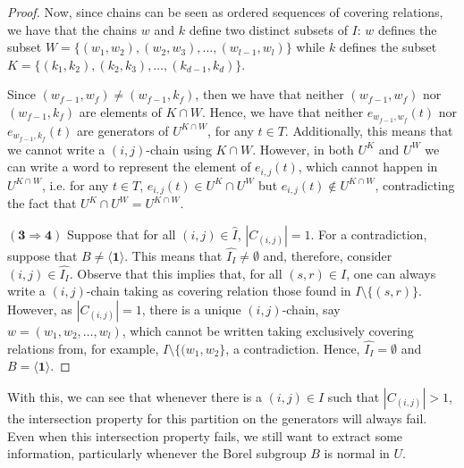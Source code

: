 \documentclass[11pt,letterpaper]{amsart}
\begin{document}
\begin{proof}
    Now, since chains can be seen as ordered sequences of covering relations, we have that the chains $w$ and $k$ define two distinct subsets of $I$: $w$ defines the subset $W=\{(w_1,w_2),(w_2,w_3),\ldots,(w_{l-1},w_l)\}$ while $k$ defines the subset 
    $K=\{(k_1,k_2),(k_2,k_3),\ldots,(k_{d-1},k_d)\}$.

    Since $(w_{f-1},w_f)\neq (w_{f-1},k_f)$, then we have that neither $(w_{f-1},w_f)$ nor $(w_{f-1},k_f)$ are  elements of $K\cap W$. 
    Hence, we have that neither $e_{w_{f-1},w_f}(t)$ nor $e_{w_{f-1},k_f}(t)$ are generators of $U^{K\cap W}$, for any $t\in T$. Additionally, this means that we cannot write a $(i,j)$-chain using $K\cap W$.
    However, in both $U^K$ and $U^W$ we can write a word to represent the element of $e_{i,j}(t)$, which cannot happen in $U^{K\cap W}$, i.e. for any $t\in T$, $e_{i,j}(t)\in U^K\cap U^W$ but $e_{i,j}(t)\notin U^{K\cap W}$, contradicting the fact that $U^K\cap U^W=U^{K\cap W}$.

    
    $\mathbf{(3\Rightarrow 4)}$ Suppose that for all $(i,j)\in \widehat{I}$, $|C_{(i,j)}| = 1$. For a contradiction, suppose that $B\neq \langle \mathbf{1}\rangle$. This means that $\widehat{I_I}\neq \emptyset$ and, therefore, consider $(i,j)\in \widehat{I_I}$. Observe that this implies that, for all $(s,r)\in I$, one can always write a $(i,j)$-chain taking as covering relation those found in $I\setminus\{(s,r)\}$. However, as $|C_{(i,j)}|=1$, there is a unique $(i,j)$-chain, say $w = (w_1,w_2,\ldots,w_l)$, which cannot be written taking exclusively covering relations from, for example, $I\setminus\{(w_1,w_{2}\}$, a contradiction. Hence, $\widehat{I_I}=\emptyset$ and $B=\langle \mathbf{1}\rangle$. 


\end{proof}




With this, we can see that whenever there is a $(i,j)\in I$ such that $|C_{(i,j)}|>1$, the  intersection property for this partition on the generators will always fail. 
Even when this intersection property fails, we still want to extract some information, particularly whenever the Borel subgroup $B$ is normal in $U$.
\end{document}
